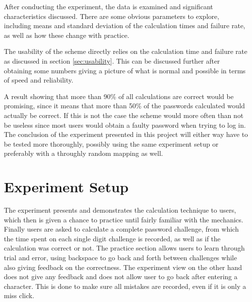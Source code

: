 \par After conducting the experiment, the data is examined and significant characteristics discussed. There are some obvious parameters to explore, including means and standard deviation of the calculation times and failure rate, as well as how these change with practice. 

\par The usability of the scheme directly relies on the calculation time and failure rate as discussed in section \ref{sec:usability}. This can be discussed further after obtaining some numbers giving a picture of what is normal and possible in terms of speed and reliability.
\par A result showing that more than 90\% of all calculations are correct would be promising, since it means that more than 50\% of the passwords calculated would actually be correct. If this is not the case the scheme would more often than not be useless since most users would obtain a faulty password when trying to log in. The conclusion of the experiment presented in this project will either way have to be tested more thoroughly, possibly using the same experiment setup or preferably with a throughly random mapping as well. 



\section{Experiment Setup}
The experiment presents and demonstrates the calculation technique to users, which then is given a chance to practice until fairly familiar with the mechanics. Finally users are asked to calculate a complete password challenge, from which the time spent on each single digit challenge is recorded, as well as if the calculation was correct or not. The practice section allows users to learn through trial and error, using backspace to go back and forth between challenges while also giving feedback on the correctness. The experiment view on the other hand does not give any feedback and does not allow user to go back after entering a character. This is done to make sure all mistakes are recorded, even if it is only a miss click. 
